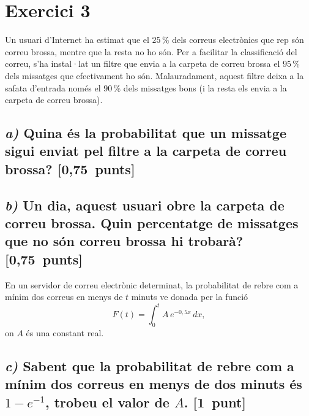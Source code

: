 \documentclass[11pt,a4paper]{article}
\begin{document}
\section*{\textcolor{blauPista}{Exercici 3}}

\noindent Un usuari d'Internet ha estimat que el $25\,\%$ dels correus electrònics que rep són correu brossa, mentre que la resta no ho són. Per a facilitar la classificació del correu, s'ha instal·lat un filtre que envia a la carpeta de correu brossa el $95\,\%$ dels missatges que efectivament ho són. Malauradament, aquest filtre deixa a la safata d'entrada només el $90\,\%$ dels missatges bons (i la resta els envia a la carpeta de correu brossa).

\subsection*{\textit{a)} \normalfont Quina és la probabilitat que un missatge sigui enviat pel filtre a la carpeta de correu brossa? \hfill\textnormal{[0,75~punts]}}


\subsection*{\textit{b)} \normalfont Un dia, aquest usuari obre la carpeta de correu brossa. Quin percentatge de missatges que no són correu brossa hi trobarà? \hfill\textnormal{[0,75~punts]}}


\vspace{0.6em}
\noindent En un servidor de correu electrònic determinat, la probabilitat de rebre com a mínim dos correus en menys de $t$ minuts ve donada per la funció
\[
F(t) = \int_{0}^{t} A\,e^{-0{,}5x}\,dx,
\]
on $A$ és una constant real.

\subsection*{\textit{c)} \normalfont Sabent que la probabilitat de rebre com a mínim dos correus en menys de dos minuts és $1 - e^{-1}$, trobeu el valor de $A$. \hfill\textnormal{[1~punt]}}

\end{document}
